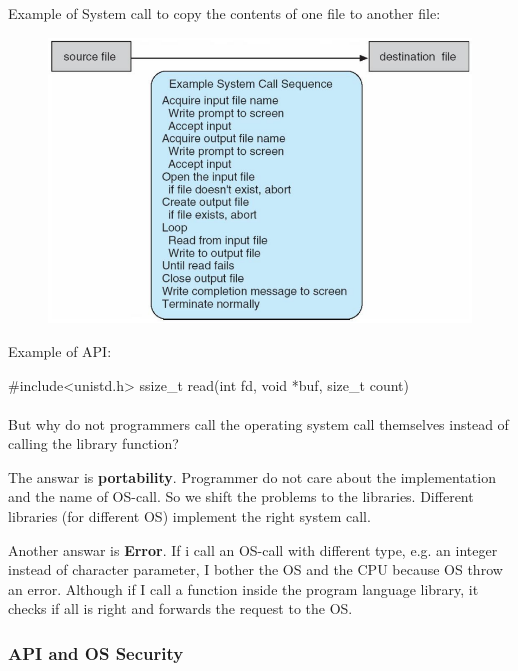 Example of System call to copy the contents of one file to another file:


\begin{figure}[htbp]
    \centering
    \includegraphics[width=0.6\linewidth]{img/image.png}    
    
\end{figure}

Example of API:




\begin{codeInC}
#include<unistd.h>
ssize_t read(int fd, void *buf, size_t count)
\end{codeInC}

\paragraph{}

But why do not programmers call the operating system call themselves instead of calling the library function?


The answar is \textbf{portability}. Programmer do not care about the implementation and the name of OS-call. So we shift the problems to the libraries. Different libraries (for different OS) implement the right system call.

Another answar is \textbf{Error}. If i call an OS-call with different type, e.g. an  integer instead of character parameter, I bother the OS and the CPU because OS throw an error.
Although if I call a function inside the program language library, it checks if all is right and forwards the request to the OS. 

\newpage
\subsubsection{API and OS Security}

